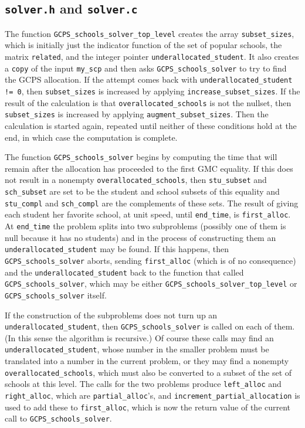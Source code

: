\documentclass[12pt]{article}
\theoremstyle{definition}
\begin{document}
\begin{appendix}
\subsection{\texttt{solver.h} and \texttt{solver.c}}

The function \texttt{GCPS\_schools\_solver\_top\_level} creates the
array \texttt{subset\_sizes}, which is initially just the indicator
function of the set of popular schools, the matrix \texttt{related},
and the integer pointer \texttt{underallocated\_student}.  It also
creates a \texttt{copy} of the input \texttt{my\_scp} and then asks
\texttt{GCPS\_schools\_solver} to try to find the GCPS allocation.  If
the attempt comes back with \texttt{underallocated\_student != 0},
then \texttt{subset\_sizes} is increased by applying
\texttt{increase\_subset\_sizes}.  If the result of the calculation is
that \texttt{overallocated\_schools} is not the nullset, then
\texttt{subset\_sizes} is increased by applying
\texttt{augment\_subset\_sizes}. Then the calculation is started
again, repeated until neither of these conditions hold at the end, in
which case the computation is complete.

The function \texttt{GCPS\_schools\_solver} begins by computing the
time that will remain after the allocation has proceeded to the first
GMC equality.  If this does not result in a nonempty
\texttt{overallocated\_schools}, then \texttt{stu\_subset} and
\texttt{sch\_subset} are set to be the student and school subsets of
this equality and \texttt{stu\_compl} and \texttt{sch\_compl} are the
complements of these sets.  The result of giving each student her
favorite school, at unit speed, until \texttt{end\_time}, is
\texttt{first\_alloc}.  At \texttt{end\_time} the problem splits into
two subproblems (possibly one of them is null because it has no
students) and in the process of constructing them an
\texttt{underallocated\_student} may be found.  If this happens, then
\texttt{GCPS\_schools\_solver} aborts, sending \texttt{first\_alloc}
(which is of no consequence) and the \texttt{underallocated\_student}
back to the function that called \texttt{GCPS\_schools\_solver}, which
may be either \texttt{GCPS\_schools\_solver\_top\_level} or
\texttt{GCPS\_schools\_solver} itself.

If the construction of the subproblems does not turn up an
\texttt{underallocated\_student}, then \texttt{GCPS\_schools\_solver}
is called on each of them. (In this sense the algorithm is recursive.)
Of course these calls may find an \texttt{underallocated\_student},
whose number in the smaller problem must be translated into a number
in the current problem, or they may find a nonempty
\texttt{overallocated\_schools}, which must also be converted to a
subset of the set of schools at this level.  The calls for the two
problems produce \texttt{left\_alloc} and \texttt{right\_alloc}, which
are \texttt{partial\_alloc}'s, and
\texttt{increment\_partial\_allocation} is used to add these to
\texttt{first\_alloc}, which is now the return value of the current
call to \texttt{GCPS\_schools\_solver}.


\end{appendix}
\end{document}
